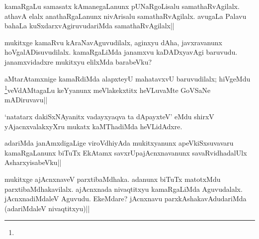 \begin{artha}
kamaRgaLu samasatx kAmanegaLanunx pUNaRgoLisalu samathaRvAgilalx. 
athavA elalx anathaRgaLanunx nivArisalu samathaRvAgilalx. avugaLa 
Palavu bahaLa kuSxdarxvAgiruvudariMda samathaRvAgilalx||
\end{artha}


\begin{artha}
mukitxge kamaRvu kAraNavAguvudilalx, aginxyu dAha, javxravanunx 
hoVgalADisuvudilalx. kamaRgaLiMda janamxvu kaDADxyavAgi baruvudu. 
janamxvidadxre mukitxyu elilxMda barabeVku?
\end{artha}


\begin{artha}
aMtarAtamxnige kamaRdiMda alapxteyU mahatavxvU baruvudilalx; hiVgeMdu 
\footnote[1]{}veVdAMtagaLu keYyanunx meVlakekxtitx heVLuvaMte GoVSaNe 
mADiruvavu||
\end{artha}


\begin{artha}
`natatarx dakiSxNAyanitx vadayxyaqva ta dApayxteV' eMdu shirxV 
yAjacnxvalakxyXru mukatx kaMThadiMda heVLidAdxre.
\end{artha}

\begin{artha}
adariMda janAmxdigaLige viroVdhiyAda mukitxyanunx apeVkiSxsuvavaru 
kamaRgaLanunx biTuTx EkAtamx savxrUpajAcnxnavanunx savaRvidhadalUlx 
AsharxyisabeVku||
\end{artha}


\begin{artha}
mukitxge ajAcnxnaveV parxtibaMdhaka. adanunx biTuTx matotxMdu 
parxtibaMdhakavilalx. ajAcnxnada nivaqtitxyu kamaRgaLiMda Aguvudalalx. 
jAcnxnadiMdaleV Aguvudu. EkeMdare? jAcnxnavu parxkAshakavAdudariMda 
(adariMdaleV nivaqtitxyu)||
\end{artha}


